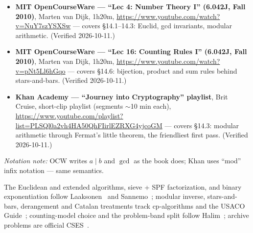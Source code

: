 \begin{rulebox}
\begin{itemize}
\item \textbf{MIT OpenCourseWare --- ``Lec 4: Number Theory I''
(6.042J, Fall 2010)}, Marten van Dijk, 1h20m,
\url{https://www.youtube.com/watch?v=NuY7szYSXSw} --- covers
\S14.1--14.3: Euclid, gcd invariants, modular arithmetic.
(Verified 2026-10-11.)
\item \textbf{MIT OpenCourseWare --- ``Lec 16: Counting Rules I''
(6.042J, Fall 2010)}, Marten van Dijk, 1h20m,
\url{https://www.youtube.com/watch?v=pNt5Ll6hGqo} --- covers
\S14.6: bijection, product and sum rules behind stars-and-bars.
(Verified 2026-10-11.)
\item \textbf{Khan Academy --- ``Journey into Cryptography''
playlist}, Brit Cruise, short-clip playlist (segments
$\sim$10 min each),
\url{https://www.youtube.com/playlist?list=PLSQl0a2vh4HA50QhFIirlEZRXG4yjcoGM}
--- covers \S14.3: modular arithmetic through Fermat's little
theorem, the friendliest first pass. (Verified 2026-10-11.)
\end{itemize}
\emph{Notation note:} OCW writes $a \mid b$ and $\gcd$ as the
book does; Khan uses ``mod'' infix notation --- same semantics.
\end{rulebox}
The Euclidean and extended algorithms, sieve + SPF factorization,
and binary exponentiation follow Laaksonen~\cite{laaksonen2024} and
Sannemo~\cite{sannemo2025}; modular inverse, stars-and-bars,
derangement and Catalan treatments track cp-algorithms and the
USACO Guide~\cite{cpalgorithms,usacoguide}; counting-model choice
and the problem-band split follow Halim~\cite{halimcp4}; archive
problems are official CSES~\cite{cses}.
